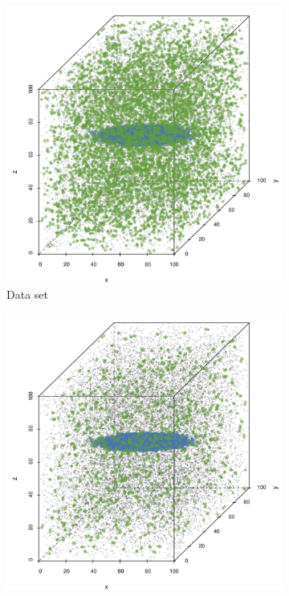 \begin{figure}
\begin{subfigure}{0.23\textwidth}
				\includegraphics[keepaspectratio=true, width=\textwidth, height=0.23\textheight]{discussion/img/baakman_1_abs_error_mbeSmallerThansambe}
				\caption{Data set \baakmanOne}
				\label{fig:discussion:performance:mbeLowerError:baakman1}
			\end{subfigure}	
			\subfigvspace
			\begin{subfigure}{0.23\textwidth}
				\centering
				\includegraphics[keepaspectratio=true, width=\textwidth, height=0.23\textheight]{discussion/img/baakman_4_abs_error_mbeSmallerThansambe}

\end{subfigure}
\end{figure}
